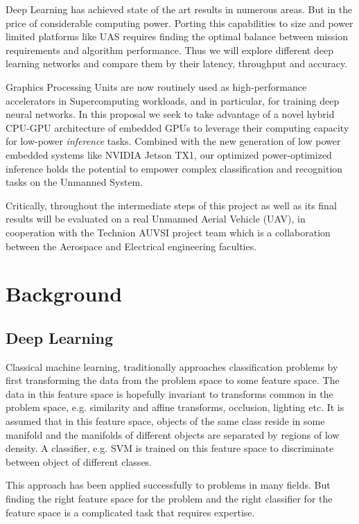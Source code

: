 \documentclass[a4paper]{article} %
\begin{document}
Deep Learning has achieved state of the art results in numerous areas. But in
the price of considerable computing power. Porting this capabilities to size and
power limited platforms like UAS requires finding the optimal balance between
mission requirements and algorithm performance. Thus we will explore different
deep learning networks and compare them by their latency, throughput and
accuracy.

Graphics Processing Units are now routinely used as high-performance
accelerators in Supercomputing workloads, and in particular, for training deep
neural networks.  In this proposal we seek to take advantage of a novel hybrid
CPU-GPU architecture of embedded GPUs to leverage their computing capacity for
low-power \emph{inference} tasks. Combined with the new generation of low power
embedded systems like NVIDIA Jetson TX1,  our optimized power-optimized
inference holds the potential to empower complex classification and recognition
tasks on the Unmanned System.

Critically, throughout the intermediate steps of this project as well as its
final results will be evaluated on a real Unmanned Aerial Vehicle (UAV), in
cooperation with the Technion AUVSI project team which is a collaboration
between the Aerospace and Electrical engineering faculties.

\section{Background}

\subsection{Deep Learning}
\label{sec:deep_learning}

Classical machine learning, traditionally approaches classification problems by
first transforming the data from the problem space to some feature space. The
data in this feature space is hopefully invariant to transforms common in the
problem space, e.g. similarity and affine transforms, occlusion, lighting etc.
It is assumed that in this feature space, objects of the same class reside in
some manifold and the manifolds of different objects are separated by regions of
low density. A classifier, e.g. SVM is trained on this feature space to
discriminate between object of different classes.

This approach has been applied successfully to problems in many fields. But
finding the right feature space for the problem and the right classifier for the
feature space is a complicated task that requires expertise.
\end{document}
